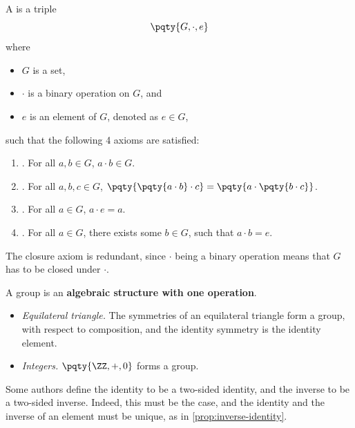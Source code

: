 \begin{definition}[Group]
    \label{def:group}%
    A  is a triple
    \[
        \pqty{G, \cdot, e}
    \]
    where
    \begin{itemize}
        \item \(G\) is a set,
        \item \(\cdot\) is a binary operation on \(G\), and
        \item \(e\) is an element of \(G\), denoted as \(e \in G\),
    \end{itemize}
    such that the following 4 axioms are satisfied:
    \begin{enumerate}
        \item {}. For all \(a, b \in G\), \(a \cdot b \in G\).
        \item {}. For all \(a, b, c \in G\), \(
        \pqty{\pqty{a \cdot b} \cdot c} = \pqty{a \cdot \pqty{b \cdot c}}\).
        \item {}. For all \(a \in G\), \(a \cdot e = a\).
        \item {}. For all \(a \in G\), there exists some \(b \in G\), such that \(a \cdot b = e\).
    \end{enumerate}
\end{definition}

\begin{remark}
    The closure axiom is redundant, since \(\cdot\) being a binary operation means that \(G\) has to be closed under \(\cdot\).
\end{remark}

A group is an \textbf{algebraic structure with one operation}.

\begin{examples*}
    \begin{itemize}
        \item \emph{Equilateral triangle.} The symmetries of an equilateral triangle form a group, with respect to composition, and the identity symmetry is the identity element.
        \item \emph{Integers.} \(\pqty{\ZZ, +, 0}\) forms a group.
    \end{itemize}
\end{examples*}

Some authors define the identity to be a two-sided identity, and the inverse to be a two-sided inverse. Indeed, this must be the case, and the identity and the inverse of an element must be unique, as in \autoref{prop:inverse-identity}.

